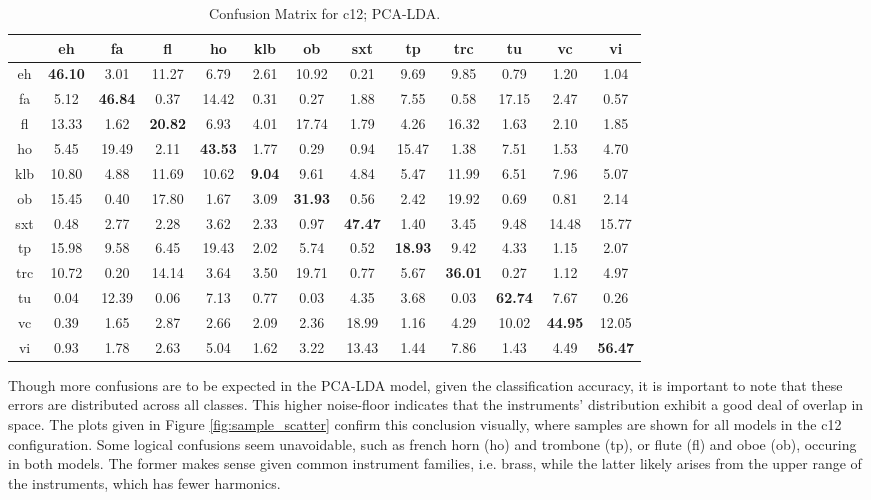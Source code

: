 \begin{table*}[h]
\begin{center}
\caption{Confusion Matrix for c12; PCA-LDA.}
\scriptsize
\begin{tabular}{c | cccccccccccc}
\hline
     &    eh &    fa &   fl &    ho &   klb &    ob &   sxt &    tp &   trc &    tu &    vc &    vi \\
\hline
 eh  & \textbf{46.10} &  3.01 & 11.27 &  6.79 &  2.61 & 10.92 &  0.21 &  9.69 &  9.85 &  0.79 &  1.20 &  1.04 \\
 fa  &  5.12 & \textbf{46.84} &  0.37 & 14.42 &  0.31 &  0.27 &  1.88 &  7.55 &  0.58 & 17.15 &  2.47 &  0.57 \\
 fl & 13.33 &  1.62 & \textbf{20.82} &  6.93 &  4.01 & 17.74 &  1.79 &  4.26 & 16.32 &  1.63 &  2.10 &  1.85 \\
 ho  &  5.45 & 19.49 &  2.11 & \textbf{43.53} &  1.77 &  0.29 &  0.94 & 15.47 &  1.38 &  7.51 &  1.53 &  4.70 \\
 klb & 10.80 &  4.88 & 11.69 & 10.62 &  \textbf{9.04} &  9.61 &  4.84 &  5.47 & 11.99 &  6.51 &  7.96 &  5.07 \\
 ob  & 15.45 &  0.40 & 17.80 &  1.67 &  3.09 & \textbf{31.93} &  0.56 &  2.42 & 19.92 &  0.69 &  0.81 &  2.14 \\
 sxt &  0.48 &  2.77 &  2.28 &  3.62 &  2.33 &  0.97 & \textbf{47.47} &  1.40 &  3.45 &  9.48 & 14.48 & 15.77 \\
 tp  & 15.98 &  9.58 &  6.45 & 19.43 &  2.02 &  5.74 &  0.52 & \textbf{18.93} &  9.42 &  4.33 &  1.15 &  2.07 \\
 trc & 10.72 &  0.20 & 14.14 &  3.64 &  3.50 & 19.71 &  0.77 &  5.67 & \textbf{36.01} &  0.27 &  1.12 &  4.97 \\
 tu  &  0.04 & 12.39 &  0.06 &  7.13 &  0.77 &  0.03 &  4.35 &  3.68 &  0.03 & \textbf{62.74} &  7.67 &  0.26 \\
 vc  &  0.39 &  1.65 &  2.87 &  2.66 &  2.09 &  2.36 & 18.99 &  1.16 &  4.29 & 10.02 & \textbf{44.95} & 12.05 \\
 vi  &  0.93 &  1.78 &  2.63 &  5.04 &  1.62 &  3.22 & 13.43 &  1.44 &  7.86 &  1.43 &  4.49 & \textbf{56.47} \\
\hline
\end{tabular}
\label{tab:things}
\end{center}
\end{table*}

Though more confusions are to be expected in the PCA-LDA model, given the classification accuracy, it is important to note that these errors are distributed across all classes.
This higher noise-floor indicates that the instruments' distribution exhibit a good deal of overlap in space.
The plots given in Figure \ref{fig:sample_scatter} confirm this conclusion visually, where samples are shown for all models in the c12 configuration.
Some logical confusions seem unavoidable, such as french horn (ho) and trombone (tp), or flute (fl) and oboe (ob), occuring in both models.
The former makes sense given common instrument families, i.e. brass, while the latter likely arises from the upper range of the instruments, which has fewer harmonics.

